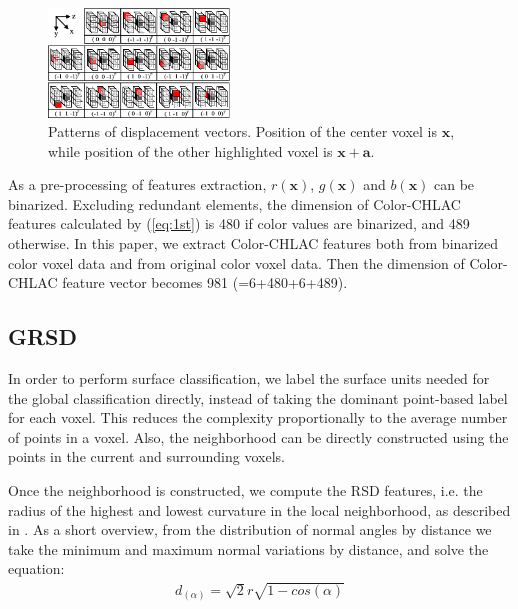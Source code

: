 \documentclass[conference]{sty/IEEEtran}
\begin{document}
\begin{figure}[htb!]
  \begin{center}
    \includegraphics[width=0.43\textwidth]{figures/colorCHLAC/displacement_vectors.png}
    \caption{Patterns of displacement vectors. Position of the center voxel is ${\bm x}$, 
      while position of the other highlighted voxel is ${\bm x}+{\bm a}$. }
    \label{fig:displacement_vectors}
  \end{center}
\end{figure}

As a pre-processing of features extraction, $r(\bm{x})$, $g(\bm{x})$ and $b(\bm{x})$ can be binarized. 
Excluding redundant elements, the dimension of Color-CHLAC features calculated by (\ref{eq:1st}) is 
    480 if color values are binarized, and 489 otherwise.
In this paper, we extract Color-CHLAC features both from binarized color voxel data and from original color voxel data. 
Then the dimension of Color-CHLAC feature vector becomes 981 (=6+480+6+489). 


\subsection{GRSD}
In order to perform surface classification, we label the surface units
needed for the global classification  directly, instead
of taking the dominant point-based label for each voxel. This reduces the
complexity proportionally to the average number of points in a voxel. Also,
the neighborhood can be directly constructed using the points in the current
and surrounding voxels.

Once the neighborhood is constructed, we compute the RSD features, i.e. the
radius of the highest and lowest curvature in the local neighborhood, as
described in \cite{Marton10IROS}. As a short overview, from the distribution
of normal angles by distance we take the minimum and maximum normal
variations by distance, and solve the equation:
\begin{align}
\label{eqn:distance_by_angle}
  d_{(\alpha)} = \sqrt{2} r \sqrt{1 - cos(\alpha)}
\end{align}
\end{document}
